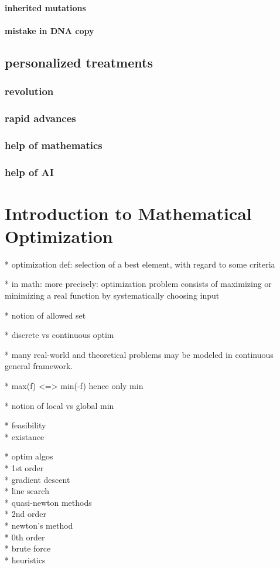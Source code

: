 \paragraph{inherited mutations}
\paragraph{mistake in DNA copy} 

\subsection{personalized treatments}
\subsubsection{revolution}
\subsubsection{rapid advances}
\subsubsection{help of mathematics}
\subsubsection{help of AI}

\section{Introduction to Mathematical Optimization}

* optimization def: selection of a best element, with regard to some criteria

* in math: more precisely: optimization problem consists of maximizing or minimizing a real function by systematically choosing input

* notion of allowed set

* discrete vs continuous optim

* many real-world and theoretical problems may be modeled in continuous general framework. 

* max(f) <=> min(-f) hence only min

* notion of local vs global min

* feasibility\\
* existance

* optim algos\\
  * 1st order\\
    * gradient descent\\
    * line search\\
    * quasi-newton methods\\
  * 2nd order\\
    * newton's method\\
  * 0th order\\
    * brute force\\
    * heuristics\\

